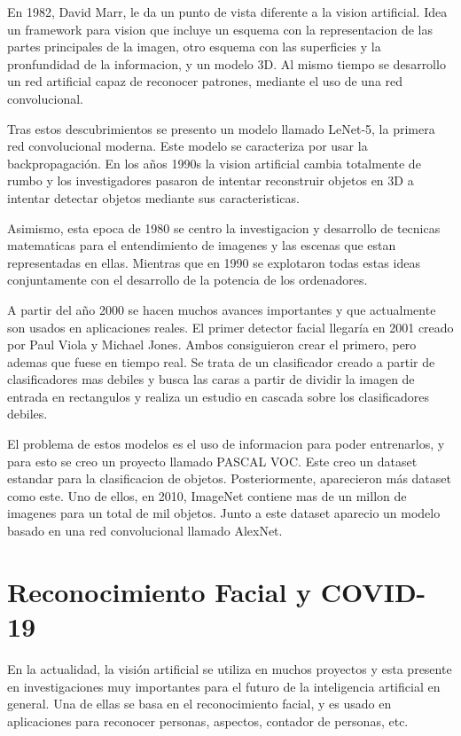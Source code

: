 En 1982, David Marr, le da un punto de vista diferente a la vision artificial. Idea un framework para vision que incluye un esquema con la representacion de las partes principales de la imagen, otro esquema con las superficies y la pronfundidad de la informacion, y un modelo 3D. Al mismo tiempo se desarrollo un red artificial capaz de reconocer patrones, mediante el uso de una red convolucional.

Tras estos descubrimientos se presento un modelo llamado LeNet-5, la primera red convolucional moderna. Este modelo se caracteriza por usar la backpropagación. En los años 1990s la vision artificial cambia totalmente de rumbo y los investigadores pasaron de intentar reconstruir objetos en 3D a intentar detectar objetos mediante sus caracteristicas.

Asimismo, esta epoca de 1980 se centro la investigacion y desarrollo de tecnicas matematicas para el entendimiento de imagenes y las escenas que estan representadas en ellas. Mientras que en 1990 se explotaron todas estas ideas conjuntamente con el desarrollo de la potencia de los ordenadores.

A partir del año 2000 se hacen muchos avances importantes y que actualmente son usados en aplicaciones reales. El primer detector facial llegaría en 2001 creado por Paul Viola y Michael Jones. Ambos consiguieron crear el primero, pero ademas que fuese en tiempo real. Se trata de un clasificador creado a partir de clasificadores mas debiles y busca las caras a partir de dividir la imagen de entrada en rectangulos y realiza un estudio en cascada sobre los clasificadores debiles.

El problema de estos modelos es el uso de informacion para poder entrenarlos, y para esto se creo un proyecto llamado PASCAL VOC. Este creo un dataset estandar para la clasificacion de objetos. Posteriormente, aparecieron más dataset como este. Uno de ellos, en 2010, ImageNet contiene mas de un millon de imagenes para un total de mil objetos. Junto a este dataset aparecio un modelo basado en una red convolucional llamado AlexNet.

\section{Reconocimiento Facial y COVID-19}

En la actualidad, la visión artificial se utiliza en muchos proyectos y esta presente en investigaciones muy importantes para el futuro de la inteligencia artificial en general. Una de ellas se basa en el reconocimiento facial, y es usado en aplicaciones para reconocer personas, aspectos, contador de personas, etc. 

